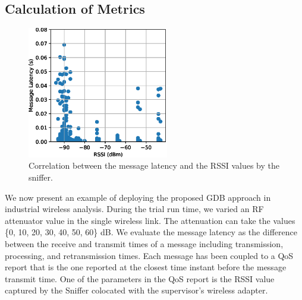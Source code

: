 \subsection{Calculation of Metrics}

\begin{figure}
	\centering
	\includegraphics[width=0.55\textwidth]{./chapter-gdb-appl/figures/database/scatter_1.eps}
	\caption{Correlation between the message latency and the RSSI values by the sniffer.}
	\label{gdbappl:fig::database:scatter}
\end{figure}

We now present an example of deploying the proposed GDB approach in industrial wireless analysis. During the trial run time, we varied an RF attenuator value in the single wireless link. The attenuation can take the values \{0, 10, 20, 30, 40, 50, 60\} dB. We evaluate the message latency as the difference between the receive and transmit times of a message including transmission, processing, and retransmission times. Each message has been coupled to a QoS report that is the one reported at the closest time instant before the message transmit time. One of the parameters in the QoS report is the RSSI value captured by the Sniffer colocated with the supervisor's wireless adapter. 

